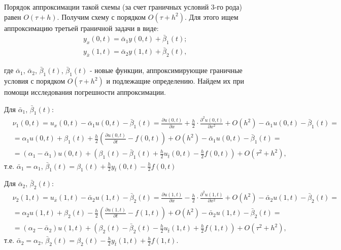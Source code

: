 Порядок аппроксимации такой схемы (за счет граничных условий $3$-го рода) равен $O(\tau + h)$. Получим схему с порядком $O(\tau + h^{2})$. Для этого ищем аппроксимацию третьей граничной задачи в виде:
\begin{eqnarray*}
& y_{x}(0,t) = \bar{\alpha}_{1}y(0,t)+\bar{\beta}_{1}(t)\text{;} \\
& y_{\bar{x}}(1,t) = \bar{\alpha}_{2}y(1,t)+\bar{\beta}_{2}(t)\text{,}
\end{eqnarray*}

где $\bar{\alpha}_{1}$, $\bar{\alpha}_{2}$, $\bar{\beta}_{1}(t)$, $\bar{\beta}_{1}(t)$ - новые функции, аппроксимирующие граничные условия с порядком $O(\tau + h^{2})$ и подлежащие определению. Найдем их при помощи исследования погрешности аппроксимации. \par

Для $\bar{\alpha}_{1}$, $\bar{\beta}_{1}(t)$:
\begin{eqnarray*}
& \nu_{1}(0,t) = u_{x}(0,t) - \bar{\alpha}_{1}u(0,t) - \bar{\beta}_{1}(t) = \frac{\partial u(0,t)}{\partial x} + \frac{h}{2}\cdot\frac{\partial^{2}u(0,t)}{\partial x^{2}} + O(h^{2}) - \bar{\alpha}_{1}u(0,t) - \bar{\beta}_{1}(t) = \\
& = \alpha_{1}u(0,t)+\beta_{1}(t) + \frac{h}{2}(\frac{\partial u(0,t)}{\partial t}-f(0,t)) + O(h^{2}) - \bar{\alpha}_{1}u(0,t) - \bar{\beta}_{1}(t) = \\
& = (\alpha_{1} - \bar{\alpha}_{1})u(0,t) + (\beta_{1}(t)-\bar{\beta}_{1}(t)+\frac{h}{2}u_{\bar{t}}(0,t)-\frac{h}{2}f(0,t)) + O(\tau^{2} + h^{2})\text{,}
\end{eqnarray*}
т.е. $\bar{\alpha}_{1}=\alpha_{1}$, $\bar{\beta}_{1}(t)=\beta_{1}(t)+\frac{h}{2} y_{\bar{t}}(0,t)-\frac{h}{2}f(0,t)$

Для $\bar{\alpha}_{2}$, $\bar{\beta}_{2}(t)$:
\begin{eqnarray*}
& \nu_{2}(1,t) = u_{\bar{x}}(1,t) - \bar{\alpha}_{2}u(1,t) - \bar{\beta}_{2}(t) = \frac{\partial u(1,t)}{\partial x} - \frac{h}{2}\cdot\frac{\partial^{2}u(1,t)}{\partial x^{2}} + O(h^{2}) - \bar{\alpha}_{2}u(1,t) - \bar{\beta}_{2}(t) = \\
& = \alpha_{2}u(1,t)+\beta_{2}(t) - \frac{h}{2}(\frac{\partial u(1,t)}{\partial t}-f(1,t)) + O(h^{2}) - \bar{\alpha}_{2}u(1,t) - \bar{\beta}_{2}(t) = \\
& = (\alpha_{2} - \bar{\alpha}_{2})u(1,t) + (\beta_{2}(t)-\bar{\beta}_{2}(t)-\frac{h}{2}u_{\bar{t}}(1,t)+\frac{h}{2}f(1,t)) + O(\tau^{2} + h^{2})\text{,}
\end{eqnarray*}
т.е. $\bar{\alpha}_{2}=\alpha_{2}$, $\bar{\beta}_{2}(t)=\beta_{2}(t)-\frac{h}{2} y_{\bar{t}}(1,t)+\frac{h}{2}f(1,t)$. \par

